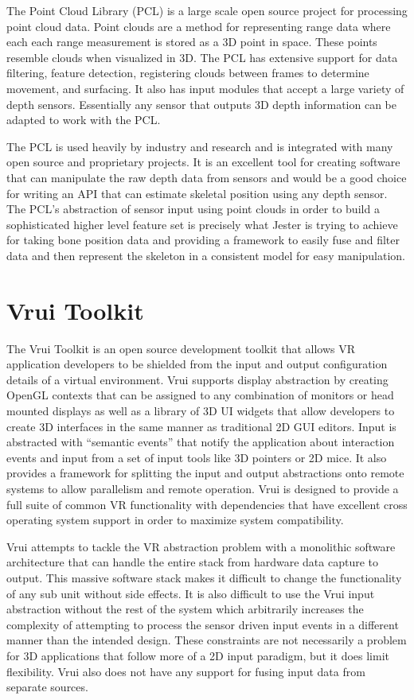 The Point Cloud Library (PCL) is a large scale open source project for processing point cloud data. Point clouds are a method for representing range data where each each range measurement is stored as a 3D point in space. These points resemble clouds when visualized in 3D. The PCL has extensive support for data filtering, feature detection, registering clouds between frames to determine movement, and surfacing. It also has input modules that accept a large variety of depth sensors. Essentially any sensor that outputs 3D depth information can be adapted to work with the PCL.

The PCL is used heavily by industry and research and is integrated with many open source and proprietary projects. It is an excellent tool for creating software that can manipulate the raw depth data from sensors and would be a good choice for writing an API that can estimate skeletal position using any depth sensor. The PCL’s abstraction of sensor input using point clouds in order to build a sophisticated higher level feature set is precisely what Jester is trying to achieve for taking bone position data and providing a framework to easily fuse and filter data and then represent the skeleton in a consistent model for easy manipulation.

\section{Vrui Toolkit}

The Vrui Toolkit is an open source development toolkit that allows VR application developers to be shielded from the input and output configuration details of a virtual environment. Vrui supports display abstraction by creating OpenGL contexts that can be assigned to any combination of monitors or head mounted displays as well as a library of 3D UI widgets that allow developers to create 3D interfaces in the same manner as traditional 2D GUI editors. Input is abstracted with “semantic events” that notify the application about interaction events and input from a set of input tools like 3D pointers or 2D mice. It also provides a framework for splitting the input and output abstractions onto remote systems to allow parallelism and remote operation. Vrui is designed to provide a full suite of common VR functionality with dependencies that have excellent cross operating system support in order to maximize system compatibility. 

Vrui attempts to tackle the VR abstraction problem with a monolithic software architecture that can handle the entire stack from hardware data capture to output. This massive software stack makes it difficult to change the functionality of any sub unit without side effects. It is also difficult to use the Vrui input abstraction without the rest of the system which arbitrarily increases the complexity of attempting to process the sensor driven input events in a different manner than the intended design. These constraints are not necessarily a problem for 3D applications that follow more of a 2D input paradigm, but it does limit flexibility. Vrui also does not have any support for fusing input data from separate sources.

